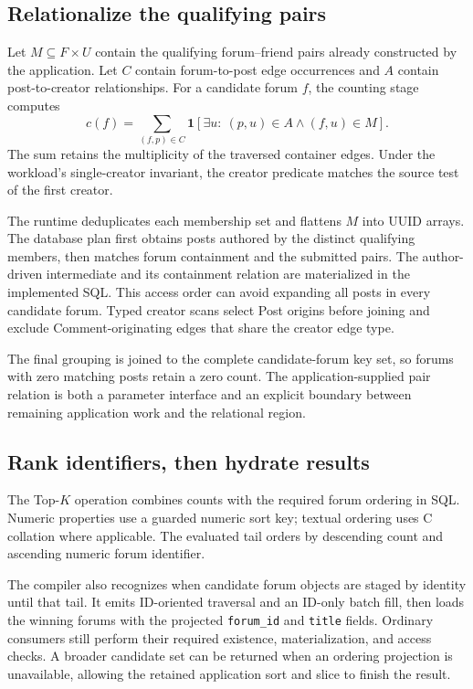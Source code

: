 \documentclass[sigconf,nonacm]{acmart}
\newcommand{\code}[1]{\texttt{#1}}
\begin{document}
\subsection{Relationalize the qualifying pairs}
Let $M\subseteq F\times U$ contain the qualifying forum--friend pairs already
constructed by the application. Let $C$ contain forum-to-post edge occurrences
and $A$ contain post-to-creator relationships. For a candidate forum $f$, the
counting stage computes
\begin{equation}
 c(f)=\sum_{(f,p)\in C}
 \mathbf{1}\!\left[\exists u:\ (p,u)\in A\land(f,u)\in M\right].
 \label{eq:count}
\end{equation}
The sum retains the multiplicity of the traversed container edges. Under the
workload's single-creator invariant, the creator predicate matches the source
test of the first creator.

The runtime deduplicates each membership set and flattens $M$ into UUID
arrays. The database plan first obtains posts authored by the distinct
qualifying members, then matches forum containment and the submitted pairs.
The author-driven intermediate and its containment relation are materialized
in the implemented SQL. This access order can avoid expanding all posts in
every candidate forum. Typed creator scans select Post origins before joining
and exclude Comment-originating edges that share the creator edge type.

The final grouping is joined to the complete candidate-forum key set, so
forums with zero matching posts retain a zero count. The application-supplied
pair relation is both a parameter interface and an explicit boundary between
remaining application work and the relational region.

\subsection{Rank identifiers, then hydrate results}
The Top-$K$ operation combines counts with the required forum ordering in
SQL. Numeric properties use a guarded numeric sort key; textual ordering uses
C collation where applicable. The evaluated tail orders by descending count
and ascending numeric forum identifier.

The compiler also recognizes when candidate forum objects are staged by
identity until that tail. It emits ID-oriented traversal and an ID-only batch
fill, then loads the winning forums with the projected \code{forum\_id} and
\code{title} fields. Ordinary consumers still perform their required
existence, materialization, and access checks. A broader candidate set can be
returned when an ordering projection is unavailable, allowing the retained
application sort and slice to finish the result.
\end{document}
